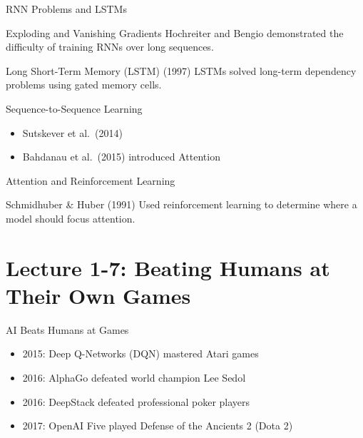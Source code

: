 \documentclass{beamer}
\begin{document}
\begin{frame}{RNN Problems and LSTMs}

\begin{alertblock}{Exploding and Vanishing Gradients}
Hochreiter and Bengio demonstrated the difficulty of training RNNs over long sequences.
\end{alertblock}

\vspace{0.2cm}

\begin{block}{Long Short-Term Memory (LSTM) (1997)}
LSTMs solved long-term dependency problems using gated memory cells.
\end{block}

\vspace{0.2cm}

\begin{exampleblock}{Sequence-to-Sequence Learning}
\begin{itemize}
\item Sutskever et al.\ (2014)
\item Bahdanau et al.\ (2015) introduced Attention
\end{itemize}
\end{exampleblock}

\end{frame}


\begin{frame}{Attention and Reinforcement Learning}

\begin{block}{Schmidhuber \& Huber (1991)}
Used reinforcement learning to determine where a model should focus attention.
\end{block}

\end{frame}

\section{Lecture 1-7: Beating Humans at Their Own Games}

\begin{frame}{AI Beats Humans at Games}

\begin{itemize}

\item 2015: Deep Q-Networks (DQN) mastered Atari games

\item 2016: AlphaGo defeated world champion Lee Sedol

\item 2016: DeepStack defeated professional poker players

\item 2017: OpenAI Five played Defense of the Ancients 2 (Dota 2)

\end{itemize}

\end{frame}
\end{document}
